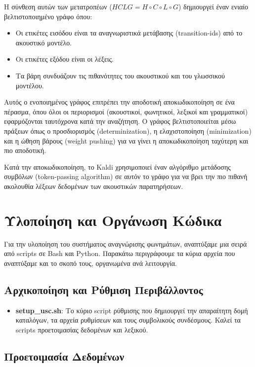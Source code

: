 \documentclass[a4paper,12pt]{article}
\begin{document}
Η σύνθεση αυτών των μετατροπέων ($HCLG = H \circ C \circ L \circ G$) δημιουργεί έναν ενιαίο βελτιστοποιημένο γράφο όπου:
\begin{itemize}
    \item Οι ετικέτες εισόδου είναι τα αναγνωριστικά μετάβασης (transition-ids) από το ακουστικό μοντέλο.
    \item Οι ετικέτες εξόδου είναι οι λέξεις.
    \item Τα βάρη συνδυάζουν τις πιθανότητες του ακουστικού και του γλωσσικού μοντέλου.
\end{itemize}

Αυτός ο ενοποιημένος γράφος επιτρέπει την αποδοτική αποκωδικοποίηση σε ένα πέρασμα, όπου όλοι οι περιορισμοί (ακουστικοί, φωνητικοί, λεξικοί και γραμματικοί) εφαρμόζονται ταυτόχρονα κατά την αναζήτηση. Ο γράφος βελτιστοποιείται μέσω πράξεων όπως ο προσδιορισμός (determinization), η ελαχιστοποίηση (minimization) και η ώθηση βάρους (weight pushing) για να γίνει η αποκωδικοποίηση ταχύτερη και πιο αποδοτική.

Κατά την αποκωδικοποίηση, το Kaldi χρησιμοποιεί έναν αλγόριθμο μετάδοσης συμβόλων (token-passing algorithm) σε αυτόν το γράφο για να βρει την πιο πιθανή ακολουθία λέξεων δεδομένων των ακουστικών παρατηρήσεων.

\section{Υλοποίηση και Οργάνωση Κώδικα}

Για την υλοποίηση του συστήματος αναγνώρισης φωνημάτων, αναπτύξαμε μια σειρά από scripts σε Bash και Python. Παρακάτω περιγράφουμε τα κύρια αρχεία που αναπτύξαμε και το σκοπό τους, οργανωμένα ανά λειτουργία.

\subsection{Αρχικοποίηση και Ρύθμιση Περιβάλλοντος}

\begin{itemize}
    \item \textbf{setup\_usc.sh}: Το κύριο script ρύθμισης που δημιουργεί την απαραίτητη δομή καταλόγων, τα αρχεία ρυθμίσεων και τους συμβολικούς συνδέσμους. Καλεί τα scripts προετοιμασίας δεδομένων και λεξικού.
\end{itemize}

\subsection{Προετοιμασία Δεδομένων}
\end{document}

